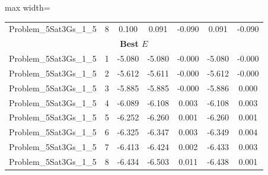 \begin{table}[!htbp]
\begin{adjustbox}{max width=\columnwidth}
\begin{tabularx}{\columnwidth}{c|c c c c c c}
            Problem\_5Sat3Gs\_1\_5 & 8 & 0.100 & 0.091 & -0.090 & 0.091 & -0.090 \\
            \multicolumn{7}{c}{\textbf{Best $E$}} \\ \midrule
            Problem\_5Sat3Gs\_1\_5 & 1 & -5.080 & -5.080 & -0.000 & -5.080 & -0.000 \\
            Problem\_5Sat3Gs\_1\_5 & 2 & -5.612 & -5.611 & -0.000 & -5.612 & -0.000 \\
            Problem\_5Sat3Gs\_1\_5 & 3 & -5.885 & -5.885 & -0.000 & -5.886 & 0.000 \\
            Problem\_5Sat3Gs\_1\_5 & 4 & -6.089 & -6.108 & 0.003 & -6.108 & 0.003 \\
            Problem\_5Sat3Gs\_1\_5 & 5 & -6.252 & -6.260 & 0.001 & -6.260 & 0.001 \\
            Problem\_5Sat3Gs\_1\_5 & 6 & -6.325 & -6.347 & 0.003 & -6.349 & 0.004 \\
            Problem\_5Sat3Gs\_1\_5 & 7 & -6.413 & -6.424 & 0.002 & -6.433 & 0.003 \\
            Problem\_5Sat3Gs\_1\_5 & 8 & -6.434 & -6.503 & 0.011 & -6.438 & 0.001 \\
            \bottomrule
        \end{tabularx}
    \end{adjustbox}
\end{table}

